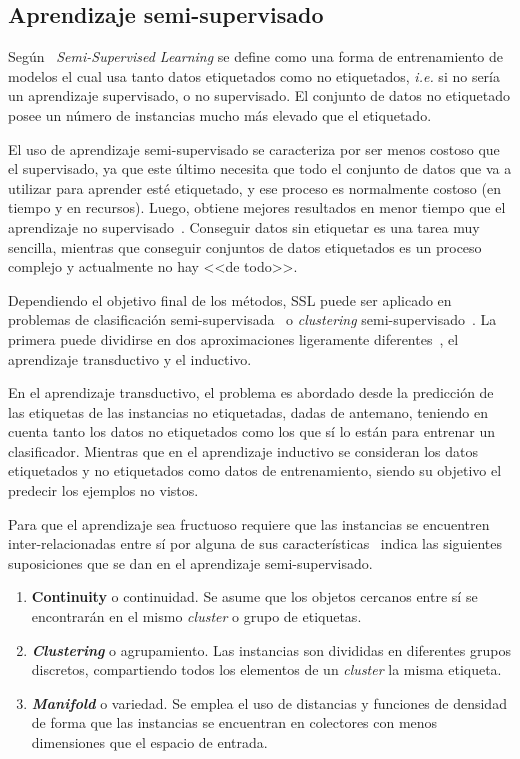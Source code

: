 \subsection{Aprendizaje semi-supervisado}\label{subsec:Aprendizaje-Semi-Supervisado}
Según~\cite{zhou2014semi} \textit{Semi-Supervised Learning} se define como una forma de entrenamiento de modelos el cual usa tanto datos etiquetados como no etiquetados, \textit{i.e.} si no sería un aprendizaje supervisado, o no supervisado. El conjunto de datos no etiquetado posee un número de instancias mucho más elevado que el etiquetado.

El uso de aprendizaje semi-supervisado se caracteriza por ser menos costoso que el supervisado, ya que este último necesita que todo el conjunto de datos que va a utilizar para aprender esté etiquetado, y ese proceso es normalmente costoso (en tiempo y en recursos). Luego, obtiene mejores resultados en menor tiempo que el aprendizaje no supervisado~\cite{van2020survey}. 
Conseguir datos sin etiquetar es una tarea muy sencilla, mientras que conseguir conjuntos de datos etiquetados es un proceso complejo y actualmente no hay <<de todo>>.

Dependiendo el objetivo final de los métodos, SSL puede ser aplicado en problemas de clasificación semi-supervisada~\cite{chapelle2009semi} o \textit{clustering} semi-supervisado~\cite{pedrycz1985algorithms}. La primera puede dividirse en dos aproximaciones ligeramente diferentes~\cite{chen2010semi}, el aprendizaje transductivo y el inductivo. 

En el aprendizaje transductivo, el problema es abordado desde la predicción de las etiquetas de las instancias no etiquetadas, dadas de antemano, teniendo en cuenta tanto los datos no etiquetados como los que sí lo están para entrenar un clasificador. Mientras que en el aprendizaje inductivo se consideran los datos etiquetados y no etiquetados como datos de entrenamiento, siendo su objetivo el predecir los ejemplos no vistos.

Para que el aprendizaje sea fructuoso requiere que las instancias se encuentren inter-relacionadas entre sí por alguna de sus características~\cite{javatpoint_semisupervised} indica las siguientes suposiciones que se dan en el aprendizaje semi-supervisado.
\begin{enumerate}
	\item \textbf{Continuity} o continuidad. Se asume que los objetos cercanos entre sí se encontrarán en el mismo \textit{cluster} o grupo de etiquetas. 
	\item \textbf{\textit{Clustering}} o agrupamiento. Las instancias son divididas en diferentes grupos discretos, compartiendo todos los elementos de un \textit{cluster} la misma etiqueta.
	\item \textbf{\textit{Manifold}} o variedad. Se emplea el uso de distancias y funciones de densidad de forma que las instancias se encuentran en colectores con menos dimensiones que el espacio de entrada.
\end{enumerate}

